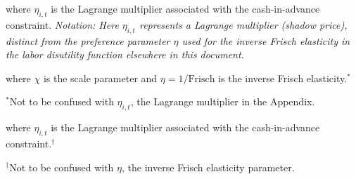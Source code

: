 where $\eta_{i,t}$ is the Lagrange multiplier associated with the cash-in-advance constraint. \emph{Notation: Here $\eta_{i,t}$ represents a Lagrange multiplier (shadow price), distinct from the preference parameter $\eta$ used for the inverse Frisch elasticity in the labor disutility function elsewhere in this document.}



where $\chi$ is the scale parameter and $\eta = 1/\text{Frisch}$ is the inverse Frisch elasticity.$^*$

\vspace{0.2cm}
\noindent $^*$\footnotesize{Not to be confused with $\eta_{i,t}$, the Lagrange multiplier in the Appendix.}

where $\eta_{i,t}$ is the Lagrange multiplier associated with the cash-in-advance constraint.$^{\dagger}$

\vspace{0.2cm}
\noindent $^{\dagger}$\footnotesize{Not to be confused with $\eta$, the inverse Frisch elasticity parameter.}



